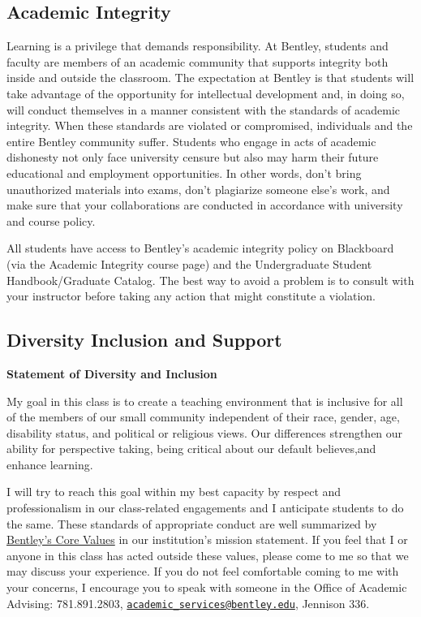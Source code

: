 \documentclass[
]{book}
\begin{document}
\hypertarget{academic-integrity}{%
\subsection*{Academic Integrity}\label{academic-integrity}}

Learning is a privilege that demands responsibility. At Bentley, students and faculty are members of an academic community that supports integrity both inside and outside the classroom. The expectation at Bentley is that students will take advantage of the opportunity for intellectual development and, in doing so, will conduct themselves in a manner consistent with the standards of academic integrity. When these standards are violated or compromised, individuals and the entire Bentley community suffer. Students who engage in acts of academic dishonesty not only face university censure but also may harm their future educational and employment opportunities. In other words, don't bring unauthorized materials into exams, don't plagiarize someone else's work, and make sure that your collaborations are conducted in accordance with university and course policy.

All students have access to Bentley's academic integrity policy on Blackboard (via the Academic Integrity course page) and the Undergraduate Student Handbook/Graduate Catalog. The best way to avoid a problem is to consult with your instructor before taking any action that might constitute a violation.

\hypertarget{diversity-inclusion-and-support}{%
\subsection*{Diversity Inclusion and Support}\label{diversity-inclusion-and-support}}

\textbf{Statement of Diversity and Inclusion}

My goal in this class is to create a teaching environment that is inclusive for all of the members of our small community independent of their race, gender, age, disability status, and political or religious views. Our differences strengthen our ability for perspective taking, being critical about our default believes,and enhance learning.

I will try to reach this goal within my best capacity by respect and professionalism in our class-related engagements and I anticipate students to do the same. These standards of appropriate conduct are well summarized by \href{https://www.bentley.edu/about/mission-and-values}{Bentley's Core Values} in our institution's mission statement. If you feel that I or anyone in this class has acted outside these values, please come to me so that we may discuss your experience. If you do not feel comfortable coming to me with your concerns, I encourage you to speak with someone in the Office of Academic Advising: 781.891.2803, \href{mailto:academic_services@bentley.edu}{\nolinkurl{academic\_services@bentley.edu}}, Jennison 336.
\end{document}
